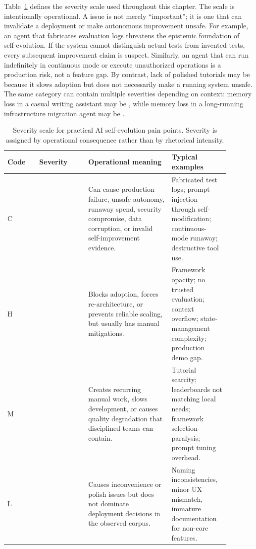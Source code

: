 Table~\ref{tab:severity-definitions} defines the severity scale used throughout this chapter. The scale is intentionally operational. A \sevcritical{} issue is not merely ``important''; it is one that can invalidate a deployment or make autonomous improvement unsafe. For example, an agent that fabricates evaluation logs threatens the epistemic foundation of self-evolution. If the system cannot distinguish actual tests from invented tests, every subsequent improvement claim is suspect. Similarly, an agent that can run indefinitely in continuous mode or execute unauthorized operations is a production risk, not a feature gap. By contrast, lack of polished tutorials may be \sevmedium{} because it slows adoption but does not necessarily make a running system unsafe. The same category can contain multiple severities depending on context: memory loss in a casual writing assistant may be \sevmedium{}, while memory loss in a long-running infrastructure migration agent may be \sevcritical{}.

\begin{table}[t]
\centering
\small
\caption{Severity scale for practical AI self-evolution pain points. Severity is assigned by operational consequence rather than by rhetorical intensity.}
\label{tab:severity-definitions}
\begin{tabular}{p{0.13\linewidth}p{0.20\linewidth}p{0.34\linewidth}p{0.22\linewidth}}
\hline
\textbf{Code} & \textbf{Severity} & \textbf{Operational meaning} & \textbf{Typical examples} \\
\hline
C & \sevcritical{} & Can cause production failure, unsafe autonomy, runaway spend, security compromise, data corruption, or invalid self-improvement evidence. & Fabricated test logs; prompt injection through self-modification; continuous-mode runaway; destructive tool use. \\
H & \sevhigh{} & Blocks adoption, forces re-architecture, or prevents reliable scaling, but usually has manual mitigations. & Framework opacity; no trusted evaluation; context overflow; state-management complexity; production demo gap. \\
M & \sevmedium{} & Creates recurring manual work, slows development, or causes quality degradation that disciplined teams can contain. & Tutorial scarcity; leaderboards not matching local needs; framework selection paralysis; prompt tuning overhead. \\
L & \sevlow{} & Causes inconvenience or polish issues but does not dominate deployment decisions in the observed corpus. & Naming inconsistencies, minor UX mismatch, immature documentation for non-core features. \\
\hline
\end{tabular}
\end{table}

